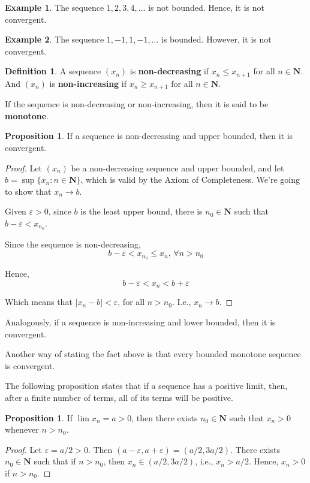 \documentclass[tikz,12pt,a4paper]{article}
\theoremstyle{definition}
\newtheorem{proposition}[theorem]{Proposition}
\newtheorem{example}{Example}[section]
\newtheorem{definition}{Definition}[section]
\begin{document}
\begin{example}
	The sequence $1,2,3,4,\ldots$ is not bounded. Hence, it is not convergent.
\end{example}

\begin{example}
	The sequence $1,-1,1,-1, \ldots$ is bounded. However, it is not convergent.
\end{example}

\begin{definition}
	A sequence $(x_n)$ is \textbf{non-decreasing} if $x_n \leq x_{n+1}$ for all $n \in \textbf{N}$. And $(x_n)$ is \textbf{non-increasing} if $x_n \geq x_{n+1}$ for all $n \in \textbf{N}$.
	
	If the sequence is non-decreasing or non-increasing, then it is said to be \textbf{monotone}.
\end{definition}

\begin{proposition}
	If a sequence is non-decreasing and upper bounded, then it is convergent. 
\end{proposition}

\begin{proof}
	Let $(x_n)$ be a non-decreasing sequence and upper bounded, and let $b = \sup\{ x_n : n \in \textbf{N} \}$, which is valid by the Axiom of Completeness. We're going to show that $x_n \longrightarrow b$.
	
	Given $\varepsilon > 0$, since $b$ is the least upper bound, there is $n_0 \in \textbf{N}$ such that $b - \varepsilon < x_{n_0}$.
	
	Since the sequence is non-decreasing,
	\[ b - \varepsilon < x_{n_0} \leq x_n, \, \forall n > n_0 \]
	
	Hence,
	\[ b - \varepsilon < x_n < b + \varepsilon \]
	
	Which means that $|x_n - b| < \varepsilon$, for all $n > n_0$. I.e., $x_n \longrightarrow b$.
\end{proof}

Analogously, if a sequence is non-increasing and lower bounded, then it is convergent.

Another way of stating the fact above is that every bounded monotone sequence is convergent.

The following proposition states that if a sequence has a positive limit, then, after a finite number of terms, all of its terms will be positive.

\begin{proposition}
	If $\lim x_n = a > 0$, then there exists $n_0 \in \textbf{N}$ such that $x_n > 0$ whenever $n > n_0$.
\end{proposition}
\begin{proof}
	Let $\varepsilon = a/2 > 0$. Then $(a-\varepsilon, a+\varepsilon) = (a/2, 3a/2)$. There exists $n_0 \in \textbf{N}$ such that if $n > n_0$, then $x_n \in (a/2, 3a/2)$, i.e., $x_n > a/2$. Hence, $x_n > 0$ if $n > n_0$.
\end{proof}
\end{document}
